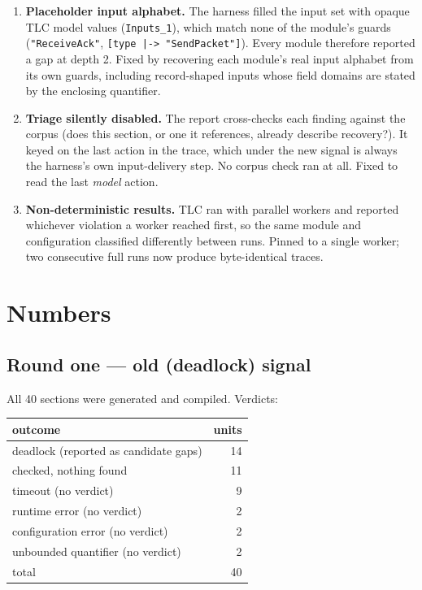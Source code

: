 \documentclass[11pt,a4paper]{article}
\begin{document}
\begin{enumerate}
  \item \textbf{Placeholder input alphabet.} The harness filled the input set with
    opaque TLC model values (\texttt{Inputs\_1}), which match none of the module's
    guards (\texttt{"ReceiveAck"}, \texttt{[type |-> "SendPacket"]}). Every module
    therefore reported a gap at depth 2. Fixed by recovering each module's real
    input alphabet from its own guards, including record-shaped inputs whose field
    domains are stated by the enclosing quantifier.

  \item \textbf{Triage silently disabled.} The report cross-checks each finding
    against the corpus (does this section, or one it references, already describe
    recovery?). It keyed on the last action in the trace, which under the new signal
    is always the harness's own input-delivery step. No corpus check ran at all.
    Fixed to read the last \emph{model} action.

  \item \textbf{Non-deterministic results.} TLC ran with parallel workers and
    reported whichever violation a worker reached first, so the same module and
    configuration classified differently between runs. Pinned to a single worker;
    two consecutive full runs now produce byte-identical traces.
\end{enumerate}

\section{Numbers}

\subsection{Round one --- old (deadlock) signal}

All 40 sections were generated and compiled. Verdicts:

\begin{center}
\begin{tabular}{lr}
\toprule
outcome & units \\
\midrule
deadlock (reported as candidate gaps) & 14 \\
checked, nothing found                & 11 \\
timeout (no verdict)                  &  9 \\
runtime error (no verdict)            &  2 \\
configuration error (no verdict)      &  2 \\
unbounded quantifier (no verdict)     &  2 \\
\midrule
total                                 & 40 \\
\bottomrule
\end{tabular}
\end{center}
\end{document}
